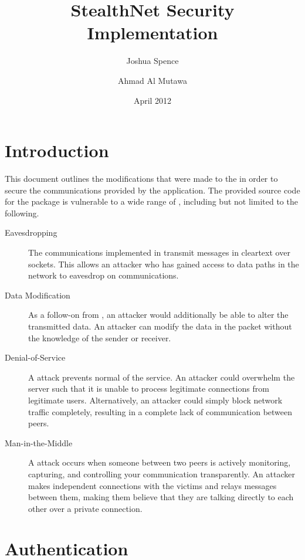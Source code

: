 \documentclass[a4paper,11pt]{article}
\title{StealthNet Security Implementation}
\author{Joshua Spence \and Ahmad Al Mutawa}
\date{April 2012}
\begin{document}
\maketitle

\section{Introduction}
This document outlines the modifications that were made to the \packageName{} in
order to secure the communications provided by the application. The provided
source code for the \packageName{} package is vulnerable to a wide range of 
, including but not limited to the following.

\begin{description}

\item[Eavesdropping] The communications implemented in \packageName{} transmit
messages in cleartext over sockets. This allows an attacker who has gained 
access to data paths in the network to eavesdrop on \packageName{} 
communications.

\item[Data Modification] As a follow-on from , an 
attacker would additionally be able to alter the transmitted data. An attacker
can modify the data in the packet without the knowledge of the sender or 
receiver.

\item[Denial-of-Service] A  attack prevents normal
of the \serviceName{} service. An attacker could overwhelm the \serviceName{} 
server such that it is unable to process legitimate connections from legitimate 
users. Alternatively, an attacker could simply block network traffic completely,
resulting in a complete lack of communication between \serviceName{} peers.

\item[Man-in-the-Middle] A  attack occurs when 
someone between two \serviceName{} peers is actively monitoring, capturing, and 
controlling your communication transparently. An attacker makes independent 
connections with the victims and relays messages between them, making them 
believe that they are talking directly to each other over a private connection.

\end{description}

\section{Authentication}
\end{document}
